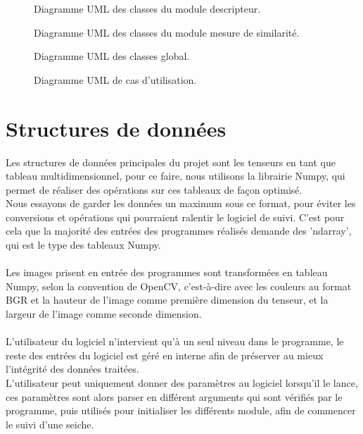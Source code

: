 \begin{figure}[!htbp]
\center
\caption{Diagramme UML des classes du module descripteur.}
\label{fig:uml_diagram_classes}
\end{figure}
\FloatBarrier

\begin{figure}[!htbp]
\center
\caption{Diagramme UML des classes du module mesure de similarité.}
\label{fig:uml_diagram_classes}
\end{figure}
\FloatBarrier

\begin{figure}[!htbp]
\center
\caption{Diagramme UML des classes global.}
\label{fig:uml_diagram_classes}
\end{figure}
\FloatBarrier

\begin{figure}[!htbp]
\center
\caption{Diagramme UML de cas d'utilisation.}
\label{fig:uml_diagram_usecase}
\end{figure}
\FloatBarrier




\section{Structures de données}
Les structures de données principales du projet sont les tenseurs en tant que tableau multidimensionnel, pour ce faire, nous utilisons la librairie Numpy, qui permet de réaliser des opérations sur ces tableaux de façon optimisé.\\
Nous essayons de garder les données un maximum sous ce format, pour éviter les conversions et opérations qui pourraient ralentir le logiciel de suivi. C'est pour cela que la majorité des entrées des programmes réalisés demande des 'ndarray', qui est le type des tableaux Numpy.\\
\\
Les images prisent en entrée des programmes sont transformées en tableau Numpy, selon la convention de OpenCV, c'est-à-dire avec les couleurs au format BGR et la hauteur de l'image comme première dimension du tenseur, et la largeur de l'image comme seconde dimension.\\
\\
L'utilisateur du logiciel n'intervient qu'à un seul niveau dans le programme, le reste des entrées du logiciel est géré en interne afin de préserver au mieux l'intégrité des données traitées.\\
L'utilisateur peut uniquement donner des paramètres au logiciel lorsqu'il le lance, ces paramètres sont alors parser en différent arguments qui sont vérifiés par le programme, puis utilisés pour initialiser les différents module, afin de commencer le suivi d'une seiche.




